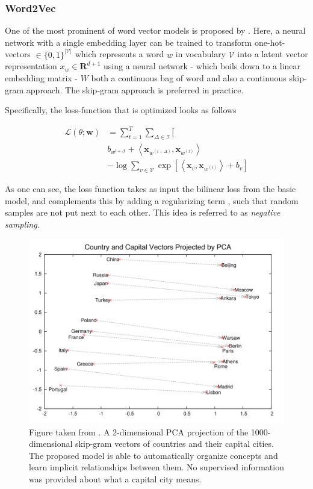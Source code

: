 \documentclass[a4paper,12pt,twoside,openright]{report}
\begin{document}
\subsubsection{Word2Vec}

One of the most prominent of word vector models is proposed by \cite{mikolov13, mikolov13b}.
Here, a neural network with a single embedding layer can be trained to transform one-hot-vectors $\in \{ 0, 1 \}^{| \mathcal{V} |}$ which represents a word $w$ in vocabulary $\mathcal{V}$
into a latent vector representation $x_w \in \mathbf{R}^{d + 1}$ using a neural network - which boils down to a linear embedding matrix - $W$ both a continuous bag of word and also a continuous skip-gram approach.
The skip-gram approach is preferred in practice.

Specifically, the loss-function that is optimized looks as follows

\begin{align} 
\mathcal{L}(\theta ; \mathbf{w}) & =\sum_{t=1}^{T} \sum_{\Delta \in \mathcal{I}} [\\ 
& b_{w^{t+\Delta}} +\left\langle \mathbf{x}_{w^{(t+\Delta)}}, \mathbf{x}_{w^{(t)}} \right\rangle \\
& -\log \sum_{v \in \mathcal{V}} \exp \left[\left\langle\mathbf{x}_{v}, \mathbf{x}_{w^{(t)}}\right\rangle+b_{v} \right] 
\end{align}

As one can see, the loss function takes as input the bilinear loss from the basic model, and complements this by adding a regularizing term , such that random samples are not put next to each other.
This idea is referred to as \textit{negative sampling}.

\begin{figure}[h]
	\center
  \includegraphics[width=0.6\linewidth]{./assets/background/word2vec_cities.png}
  \caption{Figure taken from \cite{mikolov13b}. A 2-dimensional PCA projection of the 1000-dimensional skip-gram vectors of countries and their capital cities. The proposed model is able to automatically organize concepts and learn implicit relationships between them. No supervised information was provided about what a capital city means.}
  \label{fig:cbow_skipgram}
\end{figure}
\end{document}
